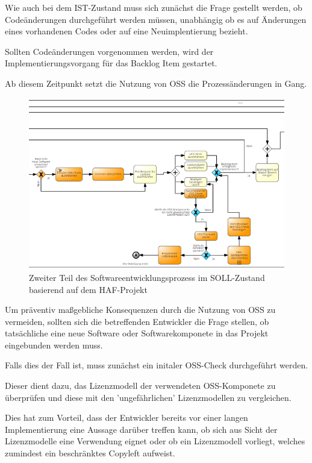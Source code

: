 Wie auch bei dem IST-Zustand muss sich zunächst die Frage gestellt werden, ob Codeänderungen durchgeführt werden müssen, unabhängig ob es auf Änderungen eines vorhandenen Codes oder auf eine Neuimplentierung bezieht. 

Sollten Codeänderungen vorgenommen werden, wird der Implementierungsvorgang für das Backlog Item gestartet. 

Ab diesem Zeitpunkt setzt die Nutzung von OSS die Prozessänderungen in Gang.

\begin{figure}[h]
    \centering
    \includegraphics[scale=0.8]{Bilder/SOLL-Prozess_second Part.png}
    \caption{Zweiter Teil des Softwareentwicklungsprozess im SOLL-Zustand basierend auf dem HAF-Projekt}
\end{figure}

Um präventiv maßgebliche Konsequenzen durch die Nutzung von OSS zu vermeiden, sollten sich die betreffenden Entwickler die Frage stellen, ob tatsächliche eine neue Software oder Softwarekomponete in das Projekt eingebunden werden muss. 

Falls dies der Fall ist, muss zunächst ein initaler OSS-Check durchgeführt werden. 

Dieser dient dazu, das Lizenzmodell der verwendeten OSS-Komponete zu überprüfen und diese mit den 'ungefährlichen' Lizenzmodellen zu vergleichen. 

Dies hat zum Vorteil, dass der Entwickler bereits vor einer langen Implementierung eine Aussage darüber treffen kann, ob sich aus Sicht der Lizenzmodelle eine Verwendung eignet oder ob ein Lizenzmodell vorliegt, welches zumindest ein beschränktes Copyleft aufweist. 

